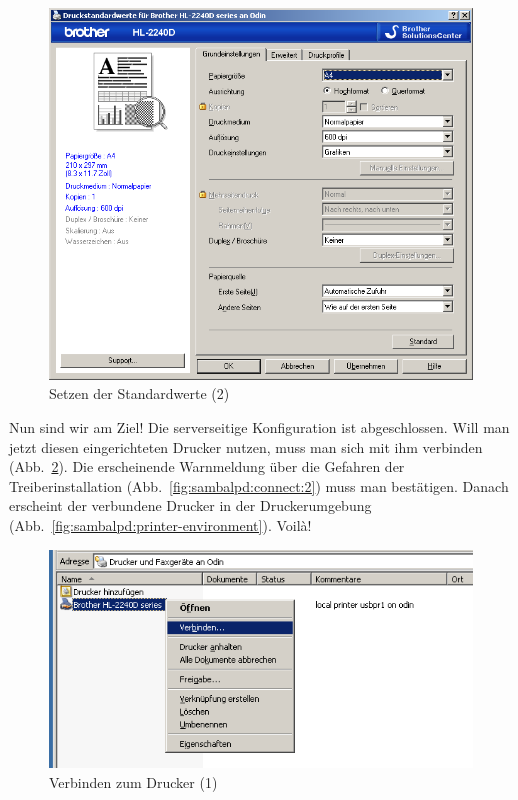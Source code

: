 \begin{figure}[hbt!]
\centering
\includegraphics[width=\columnwidth]{image019}
\caption{Setzen der Standardwerte (2)}
\label{fig:sambalpd:props-reloaded:2}
\end{figure}

Nun sind wir am Ziel! Die serverseitige Konfiguration ist abgeschlossen. Will
man jetzt diesen eingerichteten Drucker nutzen, muss man sich mit ihm verbinden
(Abb.~\ref{fig:sambalpd:connect:1}). Die erscheinende Warnmeldung über die
Gefahren der Treiberinstallation (Abb.~\ref{fig:sambalpd:connect:2}) muss man
bestätigen. Danach erscheint der verbundene Drucker in der Druckerumgebung
(Abb.~\ref{fig:sambalpd:printer-environment}). Voilà!

\begin{figure}[hbt!]
\centering
\includegraphics[width=\columnwidth]{image020}
\caption{Verbinden zum Drucker (1)}
\label{fig:sambalpd:connect:1}
\end{figure}

